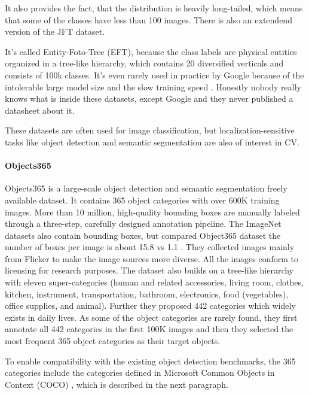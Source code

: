 \documentclass[
]{krantz}
\begin{document}
It also provides the fact, that the distribution is heavily long-tailed, which means that some of the classes have less than 100 images. There is also an extendend version of the JFT dataset.

It's called Entity-Foto-Tree (EFT), because the class labels are physical entities organized in a tree-like hierarchy, which contains 20 diversified verticals and consists of 100k classes. It's even rarely used in practice by Google because of the intolerable large model size and the slow training speed \citep{gao2017knowledge}. Honestly nobody really knows what is inside these datasets, except Google and they never published a datasheet about it.

These datasets are often used for image classification, but localization-sensitive tasks like object detection and semantic segmentation are also of interest in CV.

\hypertarget{objects365}{%
\paragraph{Objects365}\label{objects365}}

Objects365 \citep{shao2019objects365} is a large-scale object detection and semantic segmentation freely available dataset. It contains 365 object categories with over 600K training images. More than 10 million, high-quality bounding boxes are manually labeled through a three-step, carefully designed annotation pipeline. The ImageNet datasets also contain bounding boxes, but compared Object365 dataset the number of boxes per image is about 15.8 vs 1.1 \citep{deng2009imagenet}. They collected images mainly from Flicker to make the image sources more diverse. All the images conform to licensing for research purposes. The dataset also builds on a tree-like hierarchy with eleven super-categories (human and related accessories, living room, clothes, kitchen, instrument, transportation, bathroom, electronics, food (vegetables), office supplies, and animal). Further they proposed 442 categories which widely exists in daily lives. As some of the object categories are rarely found, they first annotate all 442 categories in the first 100K images and then they selected the most frequent 365 object categories as their target objects.

To enable compatibility with the existing object detection benchmarks, the 365 categories include the categories defined in Microsoft Common Objects in Context (COCO) \citep{lin2014microsoft}, which is described in the next paragraph.
\end{document}
